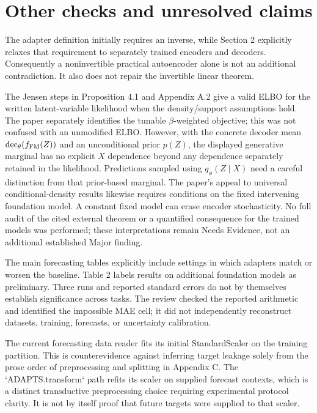 \documentclass[10pt]{article}
\begin{document}
\section*{Other checks and unresolved claims}
The adapter definition initially requires an inverse, while Section 2 explicitly relaxes that requirement to separately trained encoders and decoders. Consequently a noninvertible practical autoencoder alone is not an additional contradiction. It also does not repair the invertible linear theorem.\par
The Jensen steps in Proposition 4.1 and Appendix A.2 give a valid ELBO for the written latent-variable likelihood when the density/support assumptions hold. The paper separately identifies the tunable \(\beta\)-weighted objective; this was not confused with an unmodified ELBO. However, with the concrete decoder mean \(\operatorname{dec}_\theta(f_{\rm FM}(Z))\) and an unconditional prior \(p(Z)\), the displayed generative marginal has no explicit \(X\) dependence beyond any dependence separately retained in the likelihood. Predictions sampled using \(q_\phi(Z\mid X)\) need a careful distinction from that prior-based marginal. The paper’s appeal to universal conditional-density results likewise requires conditions on the fixed intervening foundation model. A constant fixed model can erase encoder stochasticity. No full audit of the cited external theorem or a quantified consequence for the trained models was performed; these interpretations remain Needs Evidence, not an additional established Major finding.\par
The main forecasting tables explicitly include settings in which adapters match or worsen the baseline. Table 2 labels results on additional foundation models as preliminary. Three runs and reported standard errors do not by themselves establish significance across tasks. The review checked the reported arithmetic and identified the impossible MAE cell; it did not independently reconstruct datasets, training, forecasts, or uncertainty calibration.\par
The current forecasting data reader fits its initial StandardScaler on the training partition. This is counterevidence against inferring target leakage solely from the prose order of preprocessing and splitting in Appendix C. The `ADAPTS.transform` path refits its scaler on supplied forecast contexts, which is a distinct transductive preprocessing choice requiring experimental protocol clarity. It is not by itself proof that future targets were supplied to that scaler.\par
\end{document}
